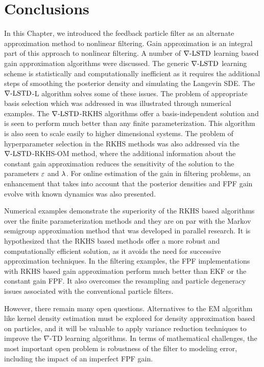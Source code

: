 \section{Conclusions}
\label{s:ch4_conclusions}
In this Chapter, we introduced the feedback particle filter as an alternate approximation method to nonlinear filtering. Gain approximation is an integral part of this approach to nonlinear filtering. A number of $\nabla\text{-LSTD}$ learning based gain approximation algorithms were discussed. The generic $\nabla\text{-LSTD}$ learning scheme is statistically and computationally inefficient as it requires the additional steps of smoothing the posterior density and simulating the Langevin SDE. The $\nabla\text{-LSTD}$-L algorithm solves some of these issues. The problem of appropriate basis selection which was addressed in  was illustrated through numerical examples. The $\nabla\text{-LSTD}$-RKHS algorithms offer a basis-independent solution and is seen to perform much better than any finite parameterization. This algorithm is also seen to scale easily to higher dimensional systems. The problem of hyperparameter selection in the RKHS methods was also addressed via the $\nabla\text{-LSTD}$-RKHS-OM method, where the additional information about the constant gain approximation reduces the sensitivity of the solution to the parameters $\varepsilon$ and $\lambda$. For online estimation of the gain in filtering problems, an enhancement that takes into account that the posterior densities and FPF gain evolve with known dynamics was also presented. 

Numerical examples demonstrate the superiority of the RKHS based algorithms over the finite parameterization methods and they are on par with the Markov semigroup approximation method that was developed in parallel research. It is hypothesized that the RKHS based methods offer a more robust and computationally efficient solution, as it avoids the need for successive approximation techniques. In the filtering examples, the FPF implementations with RKHS based gain approximation perform much better than EKF or the constant gain FPF. It also overcomes the resampling and particle degeneracy issues associated with the conventional particle filters. 

However, there remain many open questions.   Alternatives to the EM algorithm like kernel density estimation must be explored for density approximation based on particles,  and it will be valuable to apply variance reduction techniques to improve the $\nabla$-TD learning algorithms. In terms of mathematical challenges, the most important open problem is robustness of the filter to modeling error, including the impact of an imperfect FPF gain.
